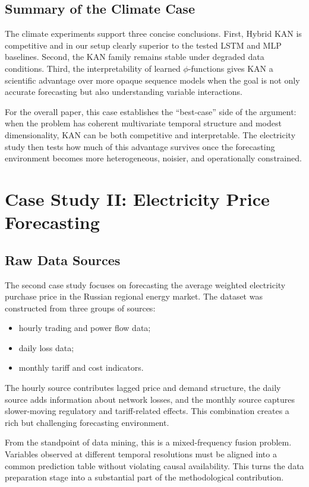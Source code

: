 \documentclass[10pt,conference,onecolumn]{IEEEtran}
\begin{document}
\subsection{Summary of the Climate Case}

The climate experiments support three concise conclusions. First, Hybrid KAN is competitive and in our setup clearly superior to the tested LSTM and MLP baselines. Second, the KAN family remains stable under degraded data conditions. Third, the interpretability of learned $\phi$-functions gives KAN a scientific advantage over more opaque sequence models when the goal is not only accurate forecasting but also understanding variable interactions.

For the overall paper, this case establishes the ``best-case'' side of the argument: when the problem has coherent multivariate temporal structure and modest dimensionality, KAN can be both competitive and interpretable. The electricity study then tests how much of this advantage survives once the forecasting environment becomes more heterogeneous, noisier, and operationally constrained.

\section{Case Study II: Electricity Price Forecasting}

\subsection{Raw Data Sources}

The second case study focuses on forecasting the average weighted electricity purchase price in the Russian regional energy market. The dataset was constructed from three groups of sources:
\begin{itemize}
    \item hourly trading and power flow data;
    \item daily loss data;
    \item monthly tariff and cost indicators.
\end{itemize}

The hourly source contributes lagged price and demand structure, the daily source adds information about network losses, and the monthly source captures slower-moving regulatory and tariff-related effects. This combination creates a rich but challenging forecasting environment.

From the standpoint of data mining, this is a mixed-frequency fusion problem. Variables observed at different temporal resolutions must be aligned into a common prediction table without violating causal availability. This turns the data preparation stage into a substantial part of the methodological contribution.
\end{document}

